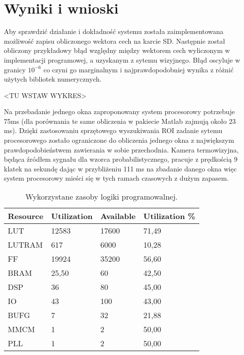 \chapter{Wyniki i wnioski}


Aby sprawdzić działanie i dokładność systemu została zaimplementowana możliwość zapisu obliczonego wektora cech na karcie SD. 
Następnie został obliczony przykładowy błąd względny między wektorem cech wyliczonym w implementacji programowej, a uzyskanym z sytemu wizyjnego. %
Błąd oscyluje w granicy \(10^{-6}\) co czyni go marginalnym i najprawdopodobniej wynika z różnić użytych bibliotek numerycznych.

<TU WSTAW WYKRES>

Na przebadanie jednego okna zaproponowany system procesorowy potrzebuje 75ms  (dla porównania te same obliczenia w pakiecie Matlab zajmują około 23 ms).
Dzięki zastosowaniu sprzętowego wyszukiwania ROI zadanie sytemu procesorowego zostało ograniczone do obliczenia jednego okna z największym prawdopodobieństwem zawierania w sobie przechodnia. %
Kamera termowizyjna, będąca źródłem sygnału dla wzorca probabilistycznego, pracuje z prędkością 9 klatek na sekundę dając w przybliżeniu 111 ms na zbadanie danego okna więc system procesorowy mieści się w tych ramach czasowych z dużym zapasem. %

\begin{table}[]
\centering
\caption{Wykorzystane zasoby logiki programowalnej.}
\label{tab:resources}
\begin{tabular}{|l|l|l|l|}
\hline
Resource & Utilization & Available & Utilization \% \\ \hline %
LUT & 12583 & 17600 & 71,49 \\ \hline 
LUTRAM & 617 & 6000 & 10,28 \\ \hline 
FF & 19924 & 35200 & 56,60 \\ \hline
BRAM & 25,50 & 60 & 42,50 \\ \hline
DSP & 36 & 80 & 45,00 \\ \hline
IO & 43 & 100 & 43,00 \\ \hline
BUFG & 7 & 32 & 21,88 \\ \hline
MMCM & 1 & 2 & 50,00 \\ \hline
PLL & 1 & 2 & 50,00 \\ \hline
\end{tabular}
\end{table}


